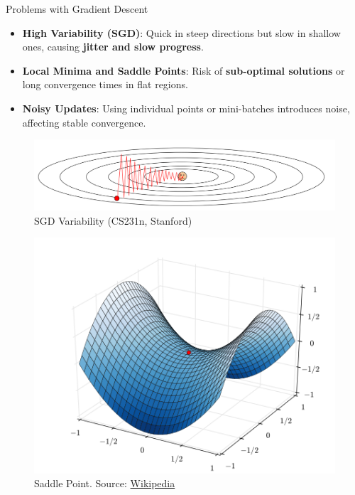 \documentclass[serif, aspectratio=169]{beamer}
\begin{document}
\begin{frame}{Problems with Gradient Descent}
    \begin{itemize}
        \item \textbf{High Variability (SGD)}: Quick in steep directions but slow in shallow ones, causing \textbf{jitter and slow progress}.
        \item \textbf{Local Minima and Saddle Points}: Risk of \textbf{sub-optimal solutions} or long convergence times in flat regions.
        \item \textbf{Noisy Updates}: Using individual points or mini-batches introduces noise, affecting stable convergence.
    \end{itemize}
    \vfill
    \begin{minipage}{0.5\linewidth}
        \begin{figure}[h]
        \centering
        \includegraphics[width=1\linewidth]{pic/sgd_stanford.png}
        \caption{\footnotesize SGD Variability (CS231n, Stanford)}
        \end{figure}
    \end{minipage}%
    \hfill
    \begin{minipage}{0.5\linewidth}
        \begin{figure}
            \centering
            \includegraphics[width=0.5\linewidth]{pic/saddle_wiki.png}
            \caption{\footnotesize Saddle Point. Source: \href{https://en.wikipedia.org/wiki/Saddle_point}{Wikipedia}}
        \end{figure}
    \end{minipage}
\end{frame}
\end{document}
